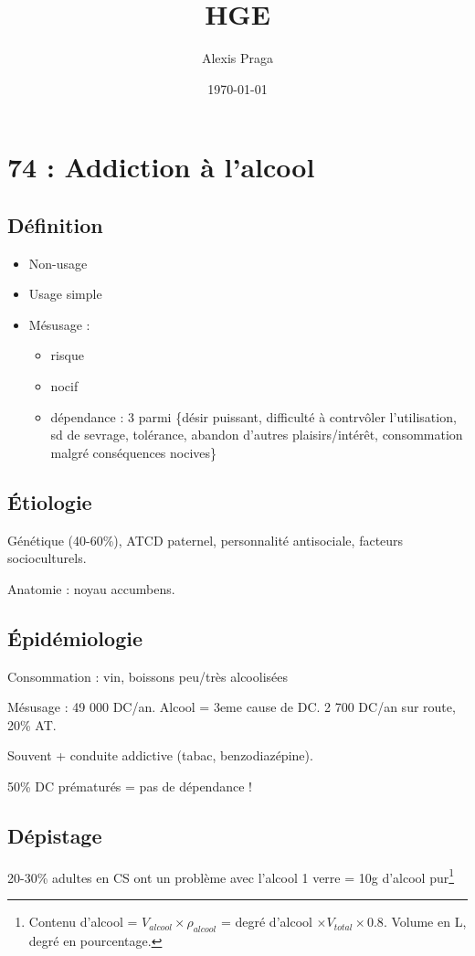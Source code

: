 \documentclass[11pt]{article}
\author{Alexis Praga}
\date{\today}
\title{HGE}
\begin{document}
\maketitle
\tableofcontents

\section{74 : Addiction à l'alcool}
\label{sec:org9f62e29}
\subsection{Définition}
\label{sec:org4ddba54}
\begin{itemize}
\item Non-usage
\item Usage simple
\item Mésusage : 
\begin{itemize}
\item risque
\item nocif
\item dépendance : 3 parmi \{désir puissant, difficulté à contrvôler l'utilisation,
sd de sevrage, tolérance, abandon d'autres plaisirs/intérêt, consommation
malgré conséquences nocives\}
\end{itemize}
\end{itemize}
\subsection{Étiologie}
\label{sec:orgac16204}
Génétique (40-60\%), ATCD paternel, personnalité antisociale, facteurs
socioculturels.

Anatomie : noyau accumbens.
\subsection{Épidémiologie}
\label{sec:org4badc67}
Consommation : \dec{} vin, \inc{} boissons peu/très alcoolisées

Mésusage : 49 000 DC/an. Alcool = 3eme cause de DC. 2 700 DC/an sur route, 20\%
AT.

Souvent + conduite addictive (tabac, benzodiazépine).

50\% DC prématurés = pas de dépendance !
\subsection{Dépistage}
\label{sec:org1f0def7}
20-30\% adultes en CS ont un problème avec l'alcool
1 verre = 10g d'alcool pur\footnote{Contenu d'alcool = \(V_{alcool} \times \rho_{alcool}\) = degré d'alcool
\(\times V_{total} \times 0.8\). Volume en L, degré en pourcentage.}
\end{document}
